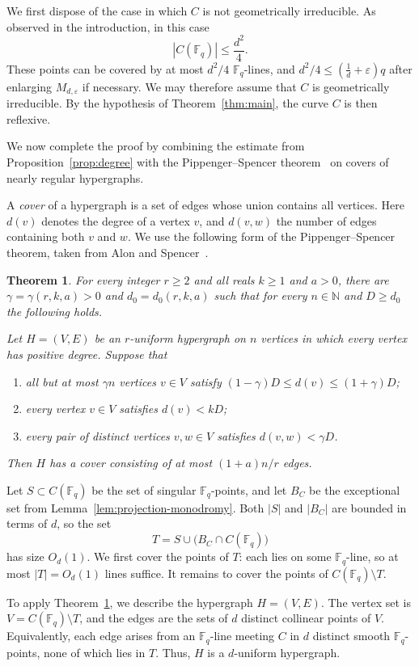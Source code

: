 \documentclass[10pt,a4paper]{amsart}
\newtheorem{theorem}{Theorem}[section]
\theoremstyle{definition}
\theoremstyle{remark}
\newcommand{\Fq}{\mathbb{F}_q}
\begin{document}
We first dispose of the case in which $C$ is not geometrically irreducible. As observed in the introduction, in this case
\[
|C(\Fq)|\leq \frac{d^2}{4}.
\]
These points can be covered by at most $d^2/4$ $\Fq$-lines, and $d^2/4 \le \left(\frac{1}{d}+\varepsilon\right)q$ after enlarging $M_{d,\varepsilon}$ if necessary. We may therefore assume that $C$ is geometrically irreducible. By the hypothesis of Theorem~\ref{thm:main}, the curve $C$ is then reflexive.

We now complete the proof by combining the estimate from Proposition~\ref{prop:degree} with the Pippenger--Spencer theorem~\cite{PS89} on covers of nearly regular hypergraphs.

A \emph{cover} of a hypergraph is a set of edges whose union contains all vertices. Here $d(v)$ denotes the degree of a vertex $v$, and $d(v,w)$ the number of edges containing both $v$ and $w$. We use the following form of the Pippenger--Spencer theorem, taken from Alon and Spencer~\cite[Theorem~4.7.1]{AS16}.

\begin{theorem}\label{thm:pippenger-spencer}
For every integer $r \geq 2$ and all reals $k \geq 1$ and $a > 0$, there are $\gamma=\gamma(r,k,a)>0$ and
$d_0=d_0(r,k,a)$ such that for every $n\in\mathbb{N}$ and $D \geq d_0$ the following holds.

Let $H=(V,E)$ be an $r$-uniform hypergraph on $n$ vertices in which every vertex has positive degree. Suppose that
\begin{enumerate}
    \item all but at most $\gamma n$ vertices $v\in V$ satisfy $(1-\gamma)D\leq d(v)\leq (1+\gamma)D$;
    \item every vertex $v\in V$ satisfies $d(v)<kD$;
    \item every pair of distinct vertices $v,w\in V$ satisfies $d(v,w)<\gamma D$.
\end{enumerate}
Then $H$ has a cover consisting of at most $(1+a)n/r$ edges.
\end{theorem}

Let $S\subset C(\Fq)$ be the set of singular $\Fq$-points, and let $B_C$ be the exceptional set from Lemma~\ref{lem:projection-monodromy}. Both $|S|$ and $|B_C|$ are bounded in terms of $d$, so the set
\[
T=S\cup\bigl(B_C\cap C(\Fq)\bigr)
\]
has size $O_d(1)$. We first cover the points of $T$: each lies on some $\Fq$-line, so at most $|T|=O_d(1)$ lines suffice. It remains to cover the points of $C(\Fq)\setminus T$.

To apply Theorem~\ref{thm:pippenger-spencer}, we describe the hypergraph $H=(V,E)$. The vertex set is $V=C(\Fq)\setminus T$, and the edges are the sets of $d$ distinct collinear points of $V$. Equivalently, each edge arises from an $\Fq$-line meeting $C$ in $d$ distinct smooth $\Fq$-points, none of which lies in $T$. Thus, $H$ is a $d$-uniform hypergraph.
\end{document}
